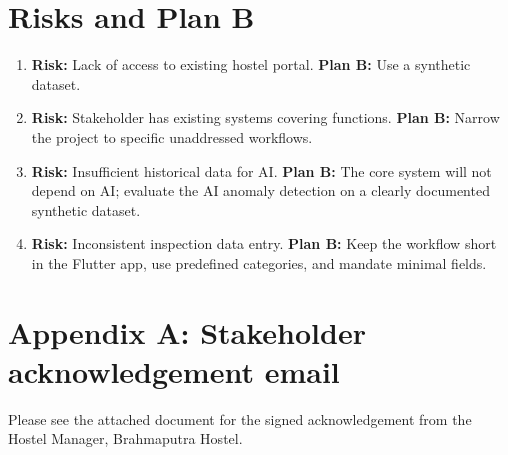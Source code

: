 \documentclass[11pt,a4paper]{article}
\begin{document}
\section{Risks and Plan B}
\begin{enumerate}
    \item \textbf{Risk:} Lack of access to existing hostel portal. \textbf{Plan B:} Use a synthetic dataset.
    \item \textbf{Risk:} Stakeholder has existing systems covering functions. \textbf{Plan B:} Narrow the project to specific unaddressed workflows.
    \item \textbf{Risk:} Insufficient historical data for AI. \textbf{Plan B:} The core system will not depend on AI; evaluate the AI anomaly detection on a clearly documented synthetic dataset.
    \item \textbf{Risk:} Inconsistent inspection data entry. \textbf{Plan B:} Keep the workflow short in the Flutter app, use predefined categories, and mandate minimal fields.
\end{enumerate}

\section*{Appendix A: Stakeholder acknowledgement email}
Please see the attached document for the signed acknowledgement from the Hostel Manager, Brahmaputra Hostel.
\end{document}
